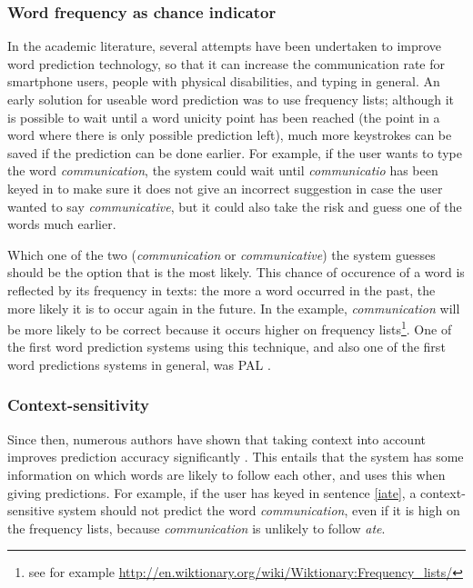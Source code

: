 \documentclass[11pt]{article}
\begin{document}
\subsubsection{Word frequency as chance indicator}

In the academic literature, several attempts have been undertaken to improve word prediction technology, so that it can increase the communication rate for smartphone users, people with physical disabilities, and typing in general. An early solution for useable word prediction was to use frequency lists; although it is possible to wait until a word unicity point has been reached (the point in a word where there is only possible prediction left), much more keystrokes can be saved if the prediction can be done earlier. For example, if the user wants to type the word \emph{communication}, the system could wait until \emph{communicatio} has been keyed in to make sure it does not give an incorrect suggestion in case the user wanted to say \emph{communicative}, but it could also take the risk and guess one of the words much earlier. 

Which one of the two (\emph{communication} or \emph{communicative}) the system guesses should be the option that is the most likely. This chance of occurence of a word is reflected by its frequency in texts: the more a word occurred in the past, the more likely it is to occur again in the future. In the example, \emph{communication} will be more likely to be correct because it occurs higher on frequency lists\footnote{see for example \url{http://en.wiktionary.org/wiki/Wiktionary:Frequency\_lists/}}. One of the first word prediction systems using this technique, and also one of the first word predictions systems in general, was PAL \cite{swiffin+85}. 

\subsubsection{Context-sensitivity} \label{context-sensitivity}

Since then, numerous authors have shown that taking context into account improves prediction accuracy significantly \cite{Lesher+99,Garay-Vitoria+06,Tanaka-Ishii07,vandenbosch+08}. This entails that the system has some information on which words are likely to follow each other, and uses this when giving predictions. For example, if the user has keyed in sentence \ref{iate}, a context-sensitive system should not predict the word \emph{communication}, even if it is high on the frequency lists, because \emph{communication} is unlikely to follow \emph{ate}.
\end{document}
